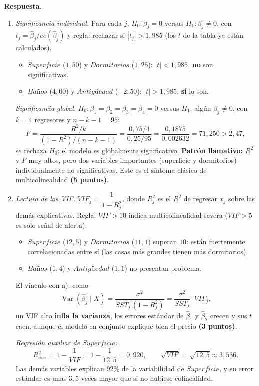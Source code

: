 \documentclass[12pt,letterpaper]{article}
\DeclareMathOperator{\var}{Var}
\newcommand{\sol}{\color{blue}}
\begin{document}
\begin{enumerate}
{\sol
\textbf{Respuesta.}
\begin{enumerate}[label=\alph*)]
    \item \textit{Significancia individual.} Para cada $j$, $H_0:\beta_j=0$ versus $H_1:\beta_j\neq0$, con $t_j=\hat\beta_j/ee(\hat\beta_j)$ y regla: rechazar si $|t_j|>1{,}985$ (los $t$ de la tabla ya están calculados).
    \begin{itemize}
        \item $Superficie$ ($1{,}50$) y $Dormitorios$ ($1{,}25$): $|t|<1{,}985$, \textbf{no} son significativas.
        \item $Baños$ ($4{,}00$) y $Antigüedad$ ($-2{,}50$): $|t|>1{,}985$, \textbf{sí} lo son.
    \end{itemize}
    \textit{Significancia global.} $H_0:\beta_1=\beta_2=\beta_3=\beta_4=0$ versus $H_1$: algún $\beta_j\neq0$, con $k=4$ regresores y $n-k-1=95$:
    \[
        F=\frac{R^2/k}{(1-R^2)/(n-k-1)}=\frac{0{,}75/4}{0{,}25/95}=\frac{0{,}1875}{0{,}002632}=71{,}250>2{,}47,
    \]
    se rechaza $H_0$: el modelo es globalmente significativo. \textbf{Patrón llamativo:} $R^2$ y $F$ muy altos, pero dos variables importantes (superficie y dormitorios) individualmente no significativas. Este es el síntoma clásico de multicolinealidad \textbf{(5 puntos)}.

    \item \textit{Lectura de los VIF.} $VIF_j=\dfrac{1}{1-R_j^2}$, donde $R_j^2$ es el $R^2$ de regresar $x_j$ sobre las demás explicativas. Regla: $VIF>10$ indica multicolinealidad severa ($VIF>5$ es solo señal de alerta).
    \begin{itemize}
        \item $Superficie$ ($12{,}5$) y $Dormitorios$ ($11{,}1$) superan $10$: están fuertemente correlacionadas entre sí (las casas más grandes tienen más dormitorios).
        \item $Baños$ ($1{,}4$) y $Antigüedad$ ($1{,}1$) no presentan problema.
    \end{itemize}
    El vínculo con a): como
    \[
        \var(\hat\beta_j\mid X)=\frac{\sigma^2}{SST_j\,(1-R_j^2)}=\frac{\sigma^2}{SST_j}\cdot VIF_j ,
    \]
    un VIF alto \textbf{infla la varianza}, los errores estándar de $\hat\beta_1$ y $\hat\beta_2$ crecen y sus $t$ caen, aunque el modelo en conjunto explique bien el precio \textbf{(3 puntos)}.

    \textit{Regresión auxiliar de $Superficie$:}
    \[
        R^2_{aux}=1-\frac{1}{VIF}=1-\frac{1}{12{,}5}=0{,}920,\qquad \sqrt{VIF}=\sqrt{12{,}5}\approx3{,}536 .
    \]
    Las demás variables explican $92\%$ de la variabilidad de $Superficie$, y su error estándar es unas $3{,}5$ veces mayor que si no hubiese colinealidad.


\end{enumerate}}
\end{enumerate}
\end{document}
